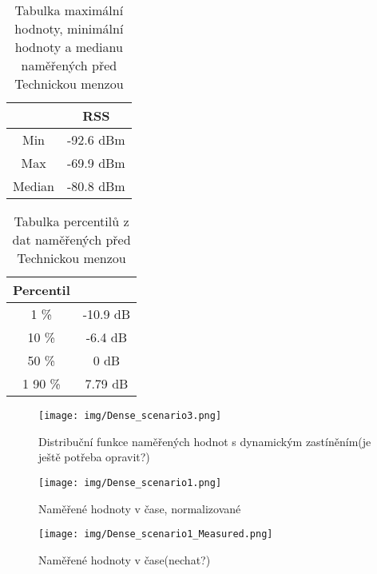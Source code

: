 \begin{table}[h!]
\centering
\begin{tabular}{|c|c|}
  \hline
   & RSS \\
  \hline
  Min & -92.6 dBm\\
  \hline
  Max & -69.9 dBm\\
  \hline
  Median & -80.8 dBm \\
  \hline
\end{tabular}
\caption{Tabulka maximální hodnoty, minimální hodnoty a medianu naměřených před Technickou menzou}
\end{table}

\clearpage

\begin{table}[h!]
\centering
\begin{tabular}{|c|c|}
  \hline
   Percentil &  \\
  \hline
  1 \% & -10.9 dB\\
  \hline
  10 \% & -6.4 dB\\
  \hline
  50 \% & 0 dB \\
  \hline1 
  90 \% & 7.79 dB \\
  \hline
\end{tabular}
\caption{Tabulka percentilů z dat naměřených před Technickou menzou}
\end{table}



\begin{figure}[h!]
    \centering
    \texttt{[image: img/Dense\_scenario3.png]}
    \caption{Distribuční funkce naměřených hodnot s dynamickým zastíněním(je ještě potřeba opravit?)}
    \label{fig:my_label}
\end{figure}

\clearpage

\begin{figure}[h!]
    \centering
    \texttt{[image: img/Dense\_scenario1.png]}
    \caption{Naměřené hodnoty v čase, normalizované}
    \label{fig:my_label}
\end{figure}

\begin{figure}[h!]
    \centering
    \texttt{[image: img/Dense\_scenario1\_Measured.png]}
    \caption{Naměřené hodnoty v čase(nechat?)}
    \label{fig:my_label}
\end{figure}



